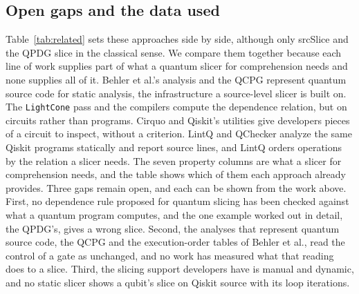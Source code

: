 \subsection{Open gaps and the data used}
Table~\ref{tab:related} sets these approaches side by side, although only srcSlice and the QPDG slice in the
classical sense. We compare them together because each line of work supplies
part of what a quantum slicer for comprehension needs and none supplies all of it. Behler et al.'s analysis and
the QCPG represent quantum source code for static analysis, the infrastructure a source-level slicer is built on.
The \texttt{LightCone} pass and the compilers compute the dependence relation, but on circuits rather than
programs. Cirquo and Qiskit's utilities give developers pieces of a circuit to inspect, without a criterion.
LintQ and QChecker analyze the same Qiskit programs statically and report source lines, and LintQ orders
operations by the relation a slicer needs. The seven property columns are what a slicer for comprehension
needs, and the table shows which of them each approach already provides.
Three gaps remain open, and each can be shown from the work above. First, no dependence rule proposed for
quantum slicing has been checked against what a quantum program computes, and the one example worked out in
detail, the QPDG's, gives a wrong slice. Second, the analyses that represent quantum source code, the QCPG and the execution-order tables
of Behler et al., read the control of a gate as unchanged, and no work has measured what that reading does to a
slice. Third, the slicing support developers have is manual and dynamic, and no
static slicer shows a qubit's slice on Qiskit source with its loop iterations.

